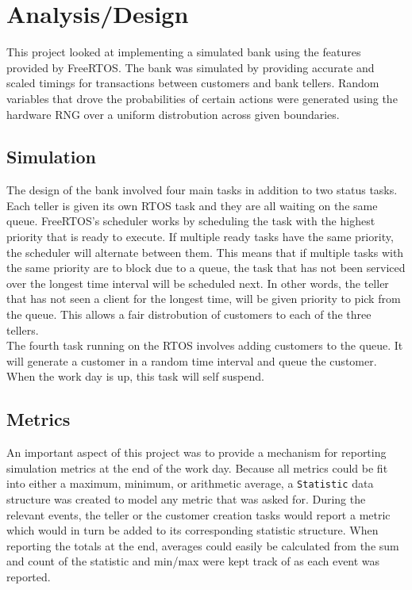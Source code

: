 \documentclass[CMPE]{KGCOEReport}
\def\code#1{\texttt{#1}}
\begin{document}
    \maketitle
    \section*{Analysis/Design}

    This project looked at implementing a simulated bank using the
    features provided by FreeRTOS. The bank was simulated by providing
    accurate and scaled timings for transactions between customers and
    bank tellers. Random variables that drove the probabilities of certain
    actions were generated using the hardware RNG over a uniform distrobution
    across given boundaries. \\

	\subsection*{Simulation}

	The design of the bank involved four main tasks in addition to two status
	tasks. Each teller is given its own RTOS task and they are all waiting on
	the same queue. FreeRTOS's scheduler works by scheduling the task with the
	highest priority that is ready to execute. If multiple ready tasks have the
	same priority, the scheduler will alternate between them. This means that if
	multiple tasks with the same priority are to block due to a queue, the task
	that has not been serviced over the longest time interval will be scheduled
	next. In other words, the teller that has not seen a client for the longest
	time, will be given priority to pick from the queue. This allows a fair
	distrobution of customers to each of the three tellers.\\

	The fourth task running on the RTOS involves adding customers to the queue.
	It will generate a customer in a random time interval and queue the customer.
	When the work day is up, this task will self suspend.

	\subsection*{Metrics}

	An important aspect of this project was to provide a mechanism for reporting
	simulation metrics at the end of the work day. Because all metrics could be
	fit into either a maximum, minimum, or arithmetic average, a \code{Statistic}
	data structure was created to model any metric that was asked for. During the
	relevant events, the teller or the customer creation tasks would report a metric
	which would in turn be added to its corresponding statistic structure. When
	reporting the totals at the end, averages could easily be calculated from the
	sum and count of the statistic and min/max were kept track of as each event was
	reported.
\end{document}
